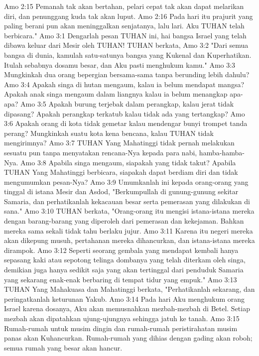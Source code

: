 Amo 2:15  Pemanah tak akan bertahan, pelari cepat tak akan dapat melarikan diri, dan penunggang kuda tak akan luput.
Amo 2:16  Pada hari itu prajurit yang paling berani pun akan meninggalkan senjatanya, lalu lari. Aku TUHAN telah berbicara."
Amo 3:1  Dengarlah pesan TUHAN ini, hai bangsa Israel yang telah dibawa keluar dari Mesir oleh TUHAN! TUHAN berkata,
Amo 3:2  "Dari semua bangsa di dunia, kamulah satu-satunya bangsa yang Kukenal dan Kuperhatikan. Itulah sebabnya dosamu besar, dan Aku pasti menghukum kamu."
Amo 3:3  Mungkinkah dua orang bepergian bersama-sama tanpa berunding lebih dahulu?
Amo 3:4  Apakah singa di hutan mengaum, kalau ia belum mendapat mangsa? Apakah anak singa mengaum dalam liangnya kalau ia belum menangkap apa-apa?
Amo 3:5  Apakah burung terjebak dalam perangkap, kalau jerat tidak dipasang? Apakah perangkap terkatub kalau tidak ada yang tertangkap?
Amo 3:6  Apakah orang di kota tidak gemetar kalau mendengar bunyi trompet tanda perang? Mungkinkah suatu kota kena bencana, kalau TUHAN tidak mengirimnya?
Amo 3:7  TUHAN Yang Mahatinggi tidak pernah melakukan sesuatu pun tanpa menyatakan rencana-Nya kepada para nabi, hamba-hamba-Nya.
Amo 3:8  Apabila singa mengaum, siapakah yang tidak takut? Apabila TUHAN Yang Mahatinggi berbicara, siapakah dapat berdiam diri dan tidak mengumumkan pesan-Nya?
Amo 3:9  Umumkanlah ini kepada orang-orang yang tinggal di istana Mesir dan Asdod, "Berkumpullah di gunung-gunung sekitar Samaria, dan perhatikanlah kekacauan besar serta pemerasan yang dilakukan di sana."
Amo 3:10  TUHAN berkata, "Orang-orang itu mengisi istana-istana mereka dengan barang-barang yang diperoleh dari pemerasan dan kekejaman. Bahkan mereka sama sekali tidak tahu berlaku jujur.
Amo 3:11  Karena itu negeri mereka akan dikepung musuh, pertahanan mereka dihancurkan, dan istana-istana mereka dirampok.
Amo 3:12  Seperti seorang gembala yang mendapat kembali hanya sepasang kaki atau sepotong telinga dombanya yang telah diterkam oleh singa, demikian juga hanya sedikit saja yang akan tertinggal dari penduduk Samaria yang sekarang enak-enak berbaring di tempat tidur yang empuk."
Amo 3:13  TUHAN Yang Mahakuasa dan Mahatinggi berkata, "Perhatikanlah sekarang, dan peringatkanlah keturunan Yakub.
Amo 3:14  Pada hari Aku menghukum orang Israel karena dosanya, Aku akan memusnahkan mezbah-mezbah di Betel. Setiap mezbah akan dipatahkan ujung-ujungnya sehingga jatuh ke tanah.
Amo 3:15  Rumah-rumah untuk musim dingin dan rumah-rumah peristirahatan musim panas akan Kuhancurkan. Rumah-rumah yang dihias dengan gading akan roboh; semua rumah yang besar akan hancur.
